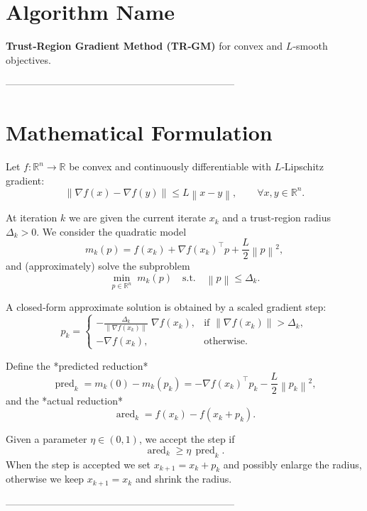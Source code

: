 \documentclass{article}
\newcommand{\norm}[1]{\left\lVert#1\right\rVert}
\newcommand{\R}{\mathbb{R}}
\begin{document}
\section*{Algorithm Name}
\textbf{Trust‑Region Gradient Method (TR‑GM)} for convex and $L$‑smooth objectives.

---------------------------------------------------------------------

\section*{Mathematical Formulation}
Let $f:\R^{n}\to\R$ be convex and continuously differentiable with $L$‑Lipschitz gradient:
\[
\norm{\nabla f(x)-\nabla f(y)}\le L\norm{x-y},\qquad\forall x,y\in\R^{n}. \tag{A1}
\]

At iteration $k$ we are given the current iterate $x_{k}$ and a trust‑region radius $\Delta_{k}>0$.
We consider the quadratic model
\[
m_{k}(p)=f(x_{k})+\nabla f(x_{k})^{\top}p+\frac{L}{2}\norm{p}^{2},
\]
and (approximately) solve the subproblem
\[
\min_{p\in\R^{n}}\; m_{k}(p)\quad\text{s.t.}\quad \norm{p}\le \Delta_{k}. \tag{TR}
\]

A closed‑form approximate solution is obtained by a scaled gradient step:
\[
p_{k}= 
\begin{cases}
-\displaystyle\frac{\Delta_{k}}{\norm{\nabla f(x_{k})}}\;\nabla f(x_{k}), & 
\text{if }\norm{\nabla f(x_{k})}>\Delta_{k},\\[2ex]
-\nabla f(x_{k}), & \text{otherwise}.
\end{cases} \tag{1}
\]

Define the *predicted reduction*
\[
\operatorname{pred}_{k}=m_{k}(0)-m_{k}(p_{k})
 = -\nabla f(x_{k})^{\top}p_{k}-\frac{L}{2}\norm{p_{k}}^{2}, \tag{2}
\]
and the *actual reduction*
\[
\operatorname{ared}_{k}=f(x_{k})-f(x_{k}+p_{k}). \tag{3}
\]

Given a parameter $\eta\in(0,1)$, we accept the step if
\[
\operatorname{ared}_{k}\ge \eta\,\operatorname{pred}_{k}. \tag{4}
\]
When the step is accepted we set $x_{k+1}=x_{k}+p_{k}$ and possibly enlarge the radius,
otherwise we keep $x_{k+1}=x_{k}$ and shrink the radius.

---------------------------------------------------------------------
\end{document}

